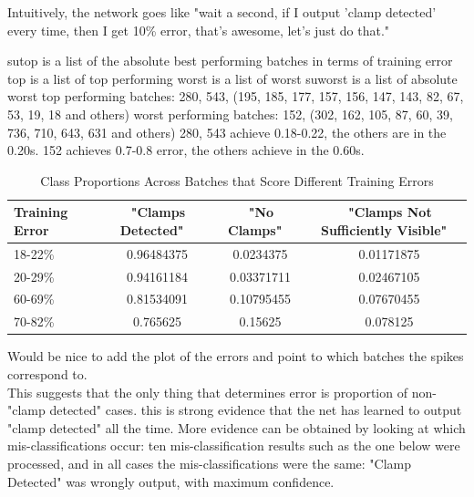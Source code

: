 \documentclass[a4paper,11pt]{article}
\begin{document}
Intuitively, the network goes like "wait a second, if I output 'clamp detected' every time, then I get 10\% error, that's awesome, let's just do that."

sutop is a list of the absolute best performing batches in terms of training error
top is a list of top performing
worst is a list of worst
suworst is a list of absolute worst
top performing batches: 280, 543, (195, 185, 177, 157, 156, 147, 143, 82, 67, 53, 19, 18 and others)
worst performing batches: 152, (302, 162, 105, 87, 60, 39, 736, 710, 643, 631 and others)
280, 543 achieve 0.18-0.22, the others are in the 0.20s. 152 achieves 0.7-0.8 error, the others achieve in the 0.60s. \\

\begin{table}[h]
   \centering
    \begin{tabular}{|l|c|c|c|}
    \hline
    Training Error   & ~  "Clamps Detected"  & ~ "No Clamps"        & ~ "Clamps Not Sufficiently Visible" \\ \hline
    18-22\%          & ~  0.96484375        & ~  0.0234375         & ~  0.01171875 \\
    20-29\%          & ~  0.94161184        & ~  0.03371711        & ~  0.02467105 \\
    60-69\%          & ~  0.81534091        & ~  0.10795455        & ~  0.07670455 \\
    70-82\%          & ~  0.765625          & ~  0.15625           & ~  0.078125   \\
    \hline
    \end{tabular}
    \caption {Class Proportions Across Batches that Score Different Training Errors}
\end{table} 

Would be nice to add the plot of the errors and point to which batches the spikes correspond to. \\

This suggests that the only thing that determines error is proportion of non-"clamp detected" cases. this is strong evidence that the net has learned to output "clamp detected" all the time. More evidence can be obtained by looking at which mis-classifications occur: ten mis-classification results such as the one below were processed, and in all cases the mis-classifications were the same: "Clamp Detected" was wrongly output, with maximum confidence.\\
\end{document}
